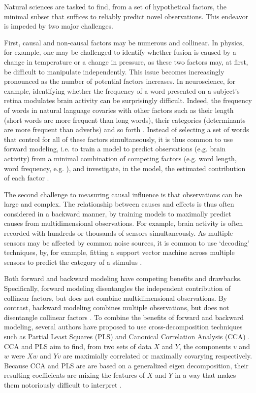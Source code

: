 Natural sciences are tasked to find, from a set of hypothetical factors, the minimal subset that suffices to reliably predict novel observations. This endeavor is impeded by two major challenges.

First, causal and non-causal factors may be numerous and collinear. In physics, for example, one may be challenged to identify whether fusion is caused by a change in temperature or a change in pressure, as these two factors may, at first, be difficult to manipulate independently. This issue becomes increasingly pronounced as the number of potential factors increases. In neuroscience, for example, identifying whether the frequency of a word presented on a subject's retina modulates brain activity can be surprisingly difficult. Indeed, the frequency of words in natural language covaries with other factors such as their length (short words are more frequent than long words), their categories (determinants are more frequent than adverbs) and so forth \citep{kutas2011thirty,pegado2014timing}. Instead of selecting a set of words that control for all of these factors simultaneously, it is thus common to use forward modeling, i.e. to train a model to predict observations (e.g. brain activity) from a minimal combination of competing factors (e.g. word length, word frequency, e.g. \citep{huth2016natural}), and investigate, in the model, the estimated contribution of each factor \citep{friston1994statistical}.

The second challenge to measuring causal influence is that observations can be large and complex. The relationship between causes and effects is thus often considered in a backward manner, by training models to maximally predict causes from multidimensional observations. For example, brain activity is often recorded with hundreds or thousands of sensors simultaneously. As multiple sensors may be affected by common noise sources, it is common to use `decoding' techniques, by, for example, fitting a support vector machine across multiple sensors to predict the category of a stimulus \citep{cichy2014resolving,  kriegeskorte2008representational, norman2006beyond}.

Both forward and backward modeling have competing benefits and drawbacks. Specifically, forward modeling disentangles the independent contribution of collinear factors, but does not combine multidimensional observations. By contrast, backward modeling combines multiple observations, but does not disentangle collinear factors \cite{weichwald2015causal, hebart2018deconstructing, king2018encoding}. To combine the benefits of forward and backward modeling, several authors have proposed to use cross-decomposition techniques such as Partial Least Squares (PLS) and Canonical Correlation Analysis (CCA) \citep{dechevigne2018CCA}.
CCA and PLS aim to find, from two sets of data $X$ and $Y$, the components $v$ and $w$ were $Xw$ and $Yv$ are maximially correlated or maximally covarying respectively. Because CCA and PLS are are based on a generalized eigen decomposition, their resulting coefficients are mixing the features of $X$ and $Y$ in a way that makes them notoriously difficult to interpret \citep{lebart1995statistique}.

